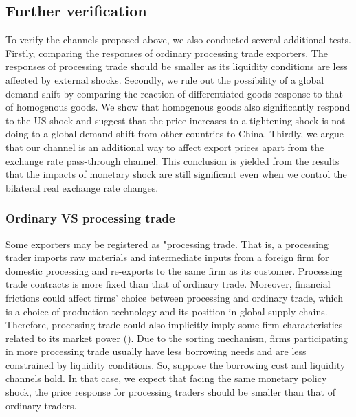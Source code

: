 \subsection{Further verification}

To verify the channels proposed above, we also conducted several additional tests. Firstly, comparing the responses of ordinary processing trade exporters. The responses of processing trade should be smaller as its liquidity conditions are less affected by external shocks. Secondly, we rule out the possibility of a global demand shift by comparing the reaction of differentiated goods response to that of homogenous goods. We show that homogenous goods also significantly respond to the US shock and suggest that the price increases to a tightening shock is not doing to a global demand shift from other countries to China. Thirdly, we argue that our channel is an additional way to affect export prices apart from the exchange rate pass-through channel. This conclusion is yielded from the results that the impacts of monetary shock are still significant even when we control the bilateral real exchange rate changes.


\subsubsection{Ordinary VS processing trade}

Some exporters may be registered as "processing trade. That is, a processing trader imports raw materials and intermediate inputs from a foreign firm for domestic processing and re-exports to the same firm as its customer. Processing trade contracts is more fixed than that of ordinary trade. Moreover, financial frictions could affect firms' choice between processing and ordinary trade, which is a choice of production technology and its position in global supply chains. Therefore, processing trade could also implicitly imply some firm characteristics related to its market power (\cite{manova2016firms}). Due to the sorting mechanism, firms participating in more processing trade usually have less borrowing needs and are less constrained by liquidity conditions. So, suppose the borrowing cost and liquidity channels hold. In that case, we expect that facing the same monetary policy shock, the price response for processing traders should be smaller than that of ordinary traders.

